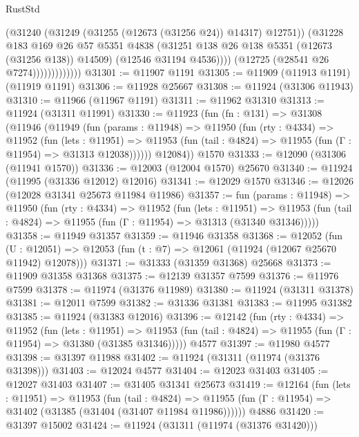 \begin{lexlean}{RustStd}
\begin{coremodule}
                              (@31240 (@31249 (@31255 (@12673 (@31256 @24)) @14317) @12751))
                              (@31228
                                @183
                                @169
                                @26
                                @57
                                @5351
                                @4838
                                (@31251 @138 @26 @138 @5351 (@12673 (@31256 @138)) @14509)
                                (@12546 @31194 @4536))))
                          (@12725 (@28541 @26 @7274)))))))))))))
@31301 := @11907 @1191
@31305 := @11909 (@11913 @1191) (@11919 @1191)
@31306 := @11928 @25667
@31308 := @11924 (@31306 @11943)
@31310 := @11966 (@11967 @1191)
@31311 := @11962 @31310
@31313 := @11924 (@31311 @11991)
@31330 := @11923
    (fun (fn : @131) =>
    @31308
      (@11946
        (@11949
          (fun (params : @11948) =>
          @11950
            (fun (rty : @4334) =>
            @11952
              (fun (lets : @11951) =>
              @11953 (fun (tail : @4824) => @11955 (fun (Γ : @11954) => @31313 @12038))))))
        @12084))
    @1570
@31333 := @12090 (@31306 (@11941 @1570))
@31336 := @12003 (@12004 @1570) @25670
@31340 := @11924 (@11995 (@31336 @12012) @12016)
@31341 := @12029 @1570
@31346 := @12026 (@12028 @31341 @25673 @11984 @11986)
@31357 := fun (params : @11948) =>
  @11950
    (fun (rty : @4334) =>
    @11952
      (fun (lets : @11951) =>
      @11953 (fun (tail : @4824) => @11955 (fun (Γ : @11954) => @31313 (@31340 @31346)))))
@31358 := @11949 @31357
@31359 := @11946 @31358
@31368 := @12052
    (fun (U : @12051) => @12053 (fun (t : @7) => @12061 (@11924 (@12067 @25670 @11942) @12078)))
@31371 := @31333 (@31359 @31368) @25668
@31373 := @11909 @31358 @31368
@31375 := @12139 @31357 @7599
@31376 := @11976 @7599
@31378 := @11974 (@31376 @11989)
@31380 := @11924 (@31311 @31378)
@31381 := @12011 @7599
@31382 := @31336 @31381
@31383 := @11995 @31382
@31385 := @11924 (@31383 @12016)
@31396 := @12142
    (fun (rty : @4334) =>
    @11952
      (fun (lets : @11951) =>
      @11953 (fun (tail : @4824) => @11955 (fun (Γ : @11954) => @31380 (@31385 @31346)))))
    @4577
@31397 := @11980 @4577
@31398 := @31397 @11988
@31402 := @11924 (@31311 (@11974 (@31376 @31398)))
@31403 := @12024 @4577
@31404 := @12023 @31403
@31405 := @12027 @31403
@31407 := @31405 @31341 @25673
@31419 := @12164
    (fun (lets : @11951) =>
    @11953
      (fun (tail : @4824) =>
      @11955 (fun (Γ : @11954) => @31402 (@31385 (@31404 (@31407 @11984 @11986))))))
    @4886
@31420 := @31397 @15002
@31424 := @11924 (@31311 (@11974 (@31376 @31420)))

\end{coremodule}
\end{lexlean}
